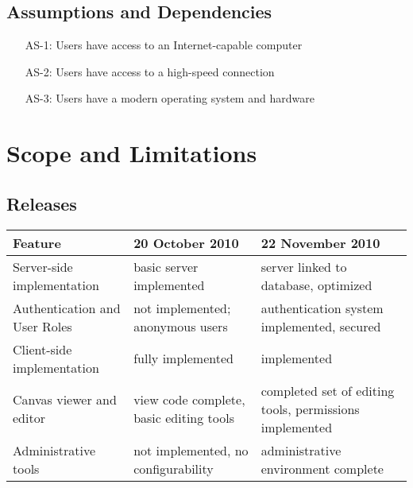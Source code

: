 \documentclass[11pt,oneside,a4paper]{article}
\begin{document}
\subsection{Assumptions and Dependencies}
\begin{itemize}
\item[AS-1:] Users have access to an Internet-capable computer
\item[AS-2:] Users have access to a high-speed connection
\item[AS-3:] Users have a modern operating system and hardware
\end{itemize}

\section{Scope and Limitations}
\subsection{Releases}
\begin{center}
\begin{tabular}{ | l | l | l | }
\hline
	\tiny{Feature}				& \tiny{20 October 2010}				& \tiny{22 November 2010} \\
\hline
\hline
	\tiny{Server-side implementation}	& \tiny{basic server implemented}			& \tiny{server linked to database, optimized} \\
	\tiny{Authentication and User Roles}	& \tiny{not implemented; anonymous users}		& \tiny{authentication system implemented, secured} \\
	\tiny{Client-side implementation}	& \tiny{fully implemented}				& \tiny{implemented} \\
	\tiny{Canvas viewer and editor}		& \tiny{view code complete, basic editing tools}	& \tiny{completed set of editing tools, permissions implemented} \\
	\tiny{Administrative tools}		& \tiny{not implemented, no configurability}		& \tiny{administrative environment complete} \\
\hline
\end{tabular}
\end{center}
\end{document}
